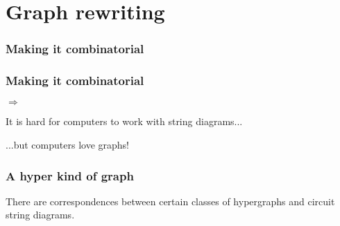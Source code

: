 \section{Graph rewriting}

\begin{frame}
    \frametitle{Making it combinatorial}

    \LARGE
    \centering


\end{frame}

\begin{frame}
    \frametitle{Making it combinatorial}

    \centering

    \pause

    \Large
    \pause
    \(\Rightarrow\)

    \pause

    \vspace{1.5em}

    It is \alert{hard} for computers to work with string diagrams...

    \pause

    ...but computers \alert{love} graphs!

\end{frame}

\begin{frame}
    \frametitle{A hyper kind of graph}

    \centering


    \vspace{1em}

    \pause
    \Large

    There are correspondences between \alert{certain classes of hypergraphs} and
    \alert{circuit string diagrams}.

    \pause
    \normalsize
    \vspace{1em}


\end{frame}

